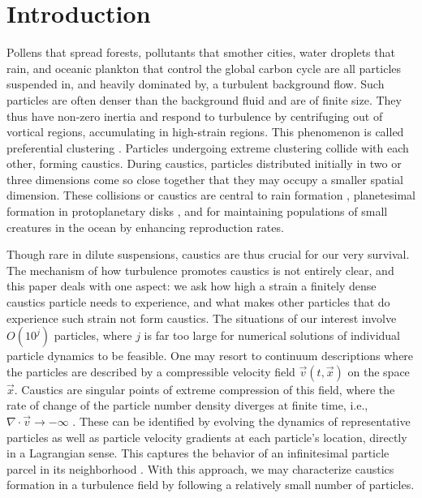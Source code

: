 \documentclass[../Rajarshi-thesis-draft.tex]{subfiles}
\begin{document}
\section{Introduction}
Pollens that spread forests, pollutants that smother cities, water droplets that rain, and oceanic plankton that control the global carbon cycle are all particles suspended in, and heavily dominated by, a turbulent background flow. Such particles are often denser than the background fluid and are of finite size. They thus have non-zero inertia and respond to turbulence by centrifuging out of vortical regions, accumulating in high-strain regions. This phenomenon is called preferential clustering \cite{crowe1985,balkovsky2001,calzavarini2008a}. Particles undergoing extreme clustering collide with each other, forming caustics. During caustics, particles distributed initially in two or three dimensions come so close together that they may occupy a smaller spatial dimension. These collisions or caustics are central to rain formation \cite{falkovich2002,shaw2003,wilkinson2006,pumir2016}, planetesimal formation in protoplanetary disks \cite{guttler2010,schrapler2011,wada2013,birnstiel2024}, and for maintaining populations of small creatures in the ocean by enhancing reproduction rates.

Though rare in dilute suspensions, caustics are thus crucial for our very survival. The mechanism of how turbulence promotes caustics is not entirely clear, and this paper deals with one aspect: we ask how high a strain a finitely dense caustics particle needs to experience, and what makes other particles that do experience such strain not form caustics.
The situations of our interest involve $O(10^j)$ particles, where $j$ is far too large for numerical solutions of individual particle dynamics to be feasible. One may resort to continuum descriptions where the particles are described by a compressible velocity field $\vec{v}(t,\vec{x})$ on the space $\vec{x}$. Caustics are singular points of extreme compression of this field, where the rate of change of the particle number density diverges at finite time, i.e., $\nabla \cdot \vec{v} \to -\infty$ \cite{falkovich2002}.
These can be identified by evolving the dynamics of representative particles as well as particle velocity gradients at each particle's location, directly in a Lagrangian sense. This captures the behavior of an infinitesimal particle parcel in its neighborhood \cite{falkovich2002,meibohm2021}. With this approach, we may characterize caustics formation in a turbulence field by following a relatively small number of particles.
\end{document}
